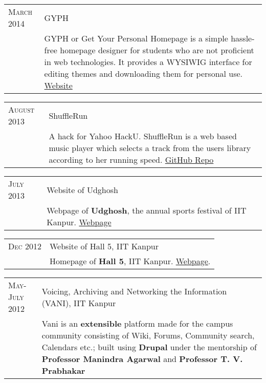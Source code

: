 \documentclass[a4paper,10pt]{article} %
\begin{document}
\begin{tabular}{p{2.2cm}|p{11cm}}
    \textsc{March 2014} & GYPH\\
                        & \footnotesize{GYPH or Get Your Personal Homepage
                           is a simple hassle-free homepage designer for students who are not
                           proficient in web technologies. It provides a WYSIWIG
                           interface for editing themes and downloading them for personal use.
                           \href{http://gyph2.herokuapp.com/} {Website} } \\
\end{tabular}

\begin{tabular}{p{2.2cm}|p{11cm}}
    \textsc{August 2013} & ShuffleRun\\
                         & \footnotesize{A hack for Yahoo HackU. ShuffleRun is a
                            web based music player which selects a track from the users library
                            according to her running speed.
                            \href{https://github.com/srijanshetty/ShuffleRun} {GitHub Repo} }\\
\end{tabular}

\begin{tabular}{p{2.2cm}|p{11cm}}
    \textsc{July 2013} & Website of Udghosh\\
                       & \footnotesize{Webpage of \textbf{Udghosh}, the annual sports festival of
                          IIT Kanpur. \href{www.udghosh.org} {Webpage} } \\
\end{tabular}

\begin{tabular}{p{2.2cm}|p{11cm}}
    \textsc{Dec 2012} & Website of Hall 5, IIT Kanpur\\
                      & \footnotesize{Homepage of \textbf{Hall 5}, IIT Kanpur.
                         \href{http://www.iitk.ac.in/hall5} {Webpage}. } \\
\end{tabular}

\begin{tabular}{p{2.2cm}|p{11cm}}
    \textsc{May-July 2012} & Voicing, Archiving and Networking the Information \textsc{(VANI)}, IIT Kanpur\\
                           & \footnotesize{Vani is an \textbf{extensible} platform
                              made for the campus community consisting of Wiki, Forums,
                              Community search, Calendars etc.; built using \textbf{Drupal}
                              under the mentorship of \textbf{Professor Manindra Agarwal} and
                              \textbf{Professor T. V. Prabhakar} } \\
\end{tabular}
\end{document}
